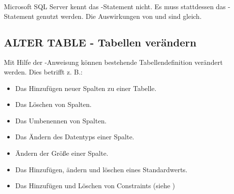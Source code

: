         \begin{merke}
          Microsoft SQL Server kennt das -Statement nicht. Es muss stattdessen das -Statement genutzt werden. Die Auswirkungen von  und  sind gleich.
        \end{merke}
      \subsection{ALTER TABLE - Tabellen verändern}
        Mit Hilfe der -Anweisung können bestehende Tabellendefinition verändert werden. Dies betrifft z. B.:
        \begin{itemize}
          \item Das Hinzufügen neuer Spalten zu einer Tabelle.
          \item Das Löschen von Spalten.
          \item Das Umbenennen von Spalten.
          \item Das Ändern des Datentyps einer Spalte.
          \item Ändern der Größe einer Spalte.
          \item Das Hinzufügen, ändern und löschen eines Standardwerts.
          \item Das Hinzufügen und Löschen von Constraints (siehe )
        \end{itemize}
